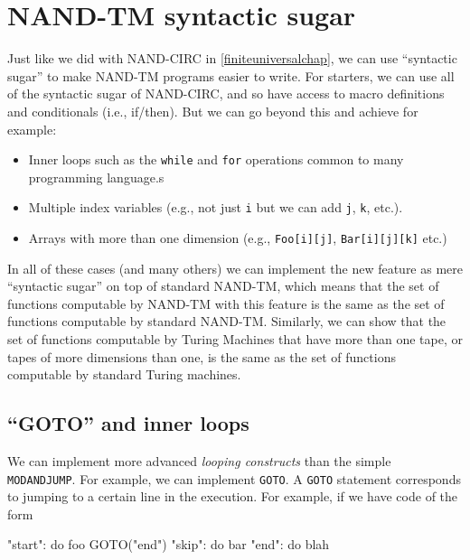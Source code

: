 \label{specvsimp}

\section{NAND-TM syntactic sugar}\label{NAND-TM-syntactic-sugar}

Just like we did with NAND-CIRC in \cref{finiteuniversalchap}, we can
use ``syntactic sugar'' to make NAND-TM programs easier to write. For
starters, we can use all of the syntactic sugar of NAND-CIRC, and so
have access to macro definitions and conditionals (i.e., if/then). But
we can go beyond this and achieve for example:

\begin{itemize}
\item
  Inner loops such as the \texttt{while} and \texttt{for} operations
  common to many programming language.s
\item
  Multiple index variables (e.g., not just \texttt{i} but we can add
  \texttt{j}, \texttt{k}, etc.).
\item
  Arrays with more than one dimension (e.g., \texttt{Foo[i][j]},
  \texttt{Bar[i][j][k]} etc.)
\end{itemize}

In all of these cases (and many others) we can implement the new feature
as mere ``syntactic sugar'' on top of standard NAND-TM, which means that
the set of functions computable by NAND-TM with this feature is the same
as the set of functions computable by standard NAND-TM. Similarly, we
can show that the set of functions computable by Turing Machines that
have more than one tape, or tapes of more dimensions than one, is the
same as the set of functions computable by standard Turing machines.

\subsection{``GOTO'' and inner loops}\label{nandtminnerloopssec}

We can implement more advanced \emph{looping constructs} than the simple
\texttt{MODANDJUMP}. For example, we can implement \texttt{GOTO}. A
\texttt{GOTO} statement corresponds to jumping to a certain line in the
execution. For example, if we have code of the form

\begin{code}
"start":  do foo
   GOTO("end")
"skip": do bar
"end": do blah
\end{code}

